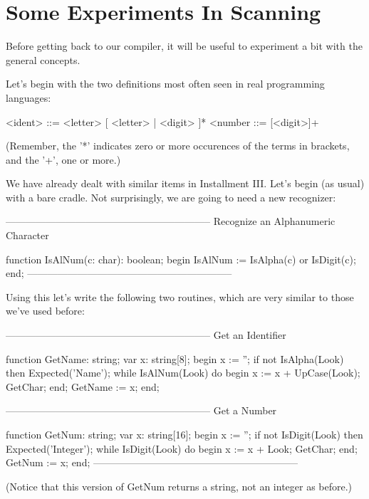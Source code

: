 \documentclass[float=false, crop=false]{standalone}
\begin{document}
\section{Some Experiments In Scanning}

Before getting back to our compiler, it will be useful to experiment a bit with
the general concepts.

Let's begin with the two definitions most often seen in real programming
languages:

     <ident> ::= <letter> [ <letter> | <digit> ]*
     <number ::= [<digit>]+

(Remember, the '*' indicates zero or more occurences of the terms in brackets,
and the '+', one or more.)

We have already dealt with similar items in Installment III. Let's begin (as
usual) with a bare cradle. Not surprisingly, we are going to need a new
recognizer:

\begin{code}
{--------------------------------------------------------------}
{ Recognize an Alphanumeric Character }

function IsAlNum(c: char): boolean;
begin
   IsAlNum := IsAlpha(c) or IsDigit(c);
end;
{--------------------------------------------------------------}
\end{code}

Using this let's write the following two routines, which are very similar to
those we've used before:

\begin{code}
{--------------------------------------------------------------}
{ Get an Identifier }

function GetName: string;
var x: string[8];
begin
   x := '';
   if not IsAlpha(Look) then Expected('Name');
   while IsAlNum(Look) do begin
     x := x + UpCase(Look);
     GetChar;
   end;
   GetName := x;
end;


{--------------------------------------------------------------}
{ Get a Number }

function GetNum: string;
var x: string[16];
begin
   x := '';
   if not IsDigit(Look) then Expected('Integer');
   while IsDigit(Look) do begin
     x := x + Look;
     GetChar;
   end;
   GetNum := x;
end;
{--------------------------------------------------------------}
\end{code}

(Notice that this version of GetNum returns a string, not an integer as before.)
\end{document}
